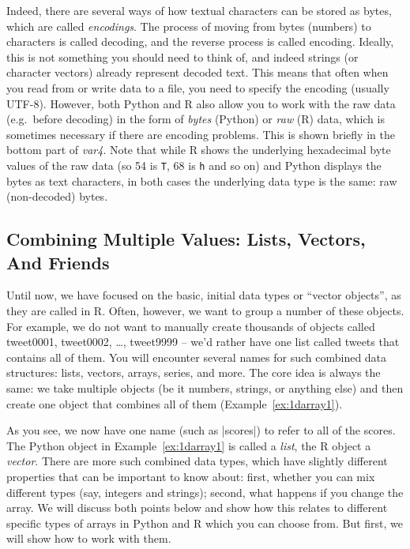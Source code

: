 Indeed, there are several ways of how textual characters can be stored as bytes,
which are called \emph{encodings}. 
The process of moving from bytes (numbers) to characters is called decoding,
and the reverse process is called encoding. 
Ideally, this is not something you should need to think of,
and indeed strings (or character vectors) already represent decoded text.
This means that often when you read from or write data to a file,
you need to specify the encoding (usually UTF-8). 
However, both Python and R also allow you to work with the raw data
(e.g.\ before decoding) in the form of \emph{bytes} (Python) or \emph{raw} (R) data,
which is sometimes necessary if there are encoding problems.
This is shown briefly in the bottom part of \emph{var4}.
Note that while R shows the underlying hexadecimal byte values of the raw data (so 54 is \verb|T|, 68 is \verb|h| and so on) and Python 
displays the bytes as text characters, in both cases the underlying data type is the same: raw (non-decoded) bytes.



\subsection{Combining Multiple Values: Lists, Vectors, And Friends}

Until now, we have focused on the basic, initial data types or ``vector
objects'', as they are called in R.  Often, however, we want to group
a number of these objects. For example, we do not want to manually
create thousands of objects called tweet0001, tweet0002, \ldots,
tweet9999 -- we'd rather have one list called tweets that contains all
of them. You will encounter several names for such combined data
structures: lists, vectors, arrays, series, and 
more. 
The core idea is always the same: we take multiple objects
(be it numbers, strings, or anything else) and then create one object that combines all of them (Example~\ref{ex:1darray1}).


As you see, we now have one name (such as |scores|) to refer to all of the scores.
The Python object in Example~\ref{ex:1darray1} is called a \emph{list}, the R object a \emph{vector}.
There are more  such combined data types, which have slightly different
properties that can be important to know about: first, whether you can mix different
types (say, integers and strings); second, what happens if you change the array.
We will discuss both points below and show how this relates to different
specific types of arrays in Python and R which you can choose from. But first,
we will show how to work with them.


